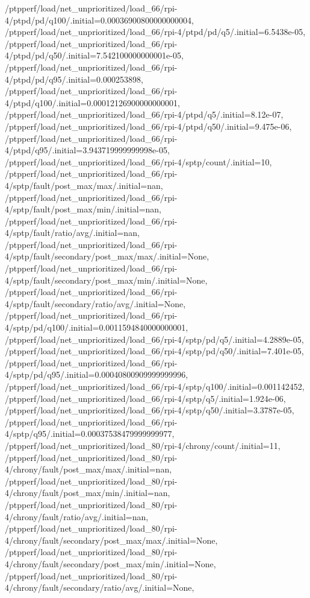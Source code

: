 {    /ptpperf/load/net_unprioritized/load_66/rpi-4/ptpd/pd/q100/.initial=0.00036900800000000004,
    /ptpperf/load/net_unprioritized/load_66/rpi-4/ptpd/pd/q5/.initial=6.5438e-05,
    /ptpperf/load/net_unprioritized/load_66/rpi-4/ptpd/pd/q50/.initial=7.542100000000001e-05,
    /ptpperf/load/net_unprioritized/load_66/rpi-4/ptpd/pd/q95/.initial=0.000253898,
    /ptpperf/load/net_unprioritized/load_66/rpi-4/ptpd/q100/.initial=0.00012126900000000001,
    /ptpperf/load/net_unprioritized/load_66/rpi-4/ptpd/q5/.initial=8.12e-07,
    /ptpperf/load/net_unprioritized/load_66/rpi-4/ptpd/q50/.initial=9.475e-06,
    /ptpperf/load/net_unprioritized/load_66/rpi-4/ptpd/q95/.initial=3.943719999999998e-05,
    /ptpperf/load/net_unprioritized/load_66/rpi-4/sptp/count/.initial=10,
    /ptpperf/load/net_unprioritized/load_66/rpi-4/sptp/fault/post_max/max/.initial=nan,
    /ptpperf/load/net_unprioritized/load_66/rpi-4/sptp/fault/post_max/min/.initial=nan,
    /ptpperf/load/net_unprioritized/load_66/rpi-4/sptp/fault/ratio/avg/.initial=nan,
    /ptpperf/load/net_unprioritized/load_66/rpi-4/sptp/fault/secondary/post_max/max/.initial=None,
    /ptpperf/load/net_unprioritized/load_66/rpi-4/sptp/fault/secondary/post_max/min/.initial=None,
    /ptpperf/load/net_unprioritized/load_66/rpi-4/sptp/fault/secondary/ratio/avg/.initial=None,
    /ptpperf/load/net_unprioritized/load_66/rpi-4/sptp/pd/q100/.initial=0.0011594840000000001,
    /ptpperf/load/net_unprioritized/load_66/rpi-4/sptp/pd/q5/.initial=4.2889e-05,
    /ptpperf/load/net_unprioritized/load_66/rpi-4/sptp/pd/q50/.initial=7.401e-05,
    /ptpperf/load/net_unprioritized/load_66/rpi-4/sptp/pd/q95/.initial=0.00040800909999999996,
    /ptpperf/load/net_unprioritized/load_66/rpi-4/sptp/q100/.initial=0.001142452,
    /ptpperf/load/net_unprioritized/load_66/rpi-4/sptp/q5/.initial=1.924e-06,
    /ptpperf/load/net_unprioritized/load_66/rpi-4/sptp/q50/.initial=3.3787e-05,
    /ptpperf/load/net_unprioritized/load_66/rpi-4/sptp/q95/.initial=0.00037538479999999977,
    /ptpperf/load/net_unprioritized/load_80/rpi-4/chrony/count/.initial=11,
    /ptpperf/load/net_unprioritized/load_80/rpi-4/chrony/fault/post_max/max/.initial=nan,
    /ptpperf/load/net_unprioritized/load_80/rpi-4/chrony/fault/post_max/min/.initial=nan,
    /ptpperf/load/net_unprioritized/load_80/rpi-4/chrony/fault/ratio/avg/.initial=nan,
    /ptpperf/load/net_unprioritized/load_80/rpi-4/chrony/fault/secondary/post_max/max/.initial=None,
    /ptpperf/load/net_unprioritized/load_80/rpi-4/chrony/fault/secondary/post_max/min/.initial=None,
    /ptpperf/load/net_unprioritized/load_80/rpi-4/chrony/fault/secondary/ratio/avg/.initial=None,
}
